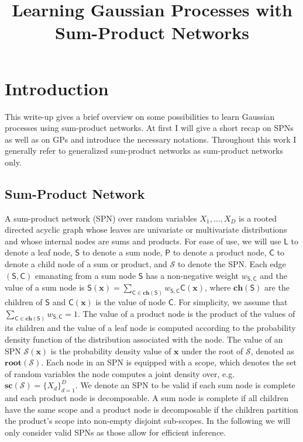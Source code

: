\documentclass[10pt,letterpaper]{article}
\newcommand{\SPN}{\mathcal{S}}
\newcommand{\x}{\mathbf{x}}
\newcommand{\ProductNode}{\mathsf{P}}
\newcommand{\SumNode}{\mathsf{S}}
\newcommand{\Leaf}{\mathsf{L}}
\newcommand{\Child}{\mathsf{C}}
\newcommand{\Root}{\ensuremath{\mathbf{root}}}
\newcommand{\ch}{\ensuremath{\mathbf{ch}}}
\newcommand{\scope}{\ensuremath{\mathbf{sc}}} %
\newcommand{\w}{w}
\theoremstyle{mystyle}
\begin{document}
\title{Learning Gaussian Processes with Sum-Product Networks}
\author{}

\maketitle
\section{Introduction}
This write-up gives a brief overview on some possibilities to learn Gaussian processes using sum-product networks.
At first I will give a short recap on SPNs as well as on GPs and introduce the necessary notations. Throughout this work I generally refer to generalized sum-product networks \cite{Peharz2015} as sum-product networks only.

\subsection{Sum-Product Network}
\label{sec:spns}
A sum-product network (SPN) \cite{Poon2011} over random variables $X_1, \dots, X_D$ is a rooted directed acyclic graph whose leaves are univariate or multivariate distributions and whose internal nodes are sums and products. 
For ease of use, we will use $\Leaf$ to denote a leaf node, $\SumNode$ to denote a sum node, $\ProductNode$ to denote a product node, $\Child$ to denote a child node of a sum or product, and $\SPN$ to denote the SPN.
Each edge $(\SumNode,\Child)$ emanating from a sum node $\SumNode$ has a non-negative weight $\w_{\SumNode,\Child}$ and the value of a sum node is $\SumNode(\x) = \sum_{\Child \in \ch(\SumNode)} \w_{\SumNode,\Child} \Child(\x)$, where $\ch(\SumNode)$ are the children of $\SumNode$ and $\Child(\x)$ is the value of node $\Child$. For simplicity, we assume that $\sum_{\Child \in \ch(\SumNode)} \w_{\SumNode,\Child} = 1$. The value of a product node is the product of the values of its children and the value of a leaf node is computed according to the probability density function of the distribution associated with the node. 
The value of an SPN $\SPN(\x)$ is the probability density value of $\x$ under the root of $\SPN$, denoted as $\Root(\SPN)$.
Each node in an SPN is equipped with a scope, which denotes the set of random variables the node computes a joint density over, e.g. $\scope(\SPN) = \{X_d\}_{d=1}^D$.
We denote an SPN to be valid if each sum node is complete and each product node is decomposable.
A sum node is complete if all children have the same scope and a product node is decomposable if the children partition the product's scope into non-empty disjoint sub-scopes.
In the following we will only consider valid SPNs as those allow for efficient inference.
\end{document}
